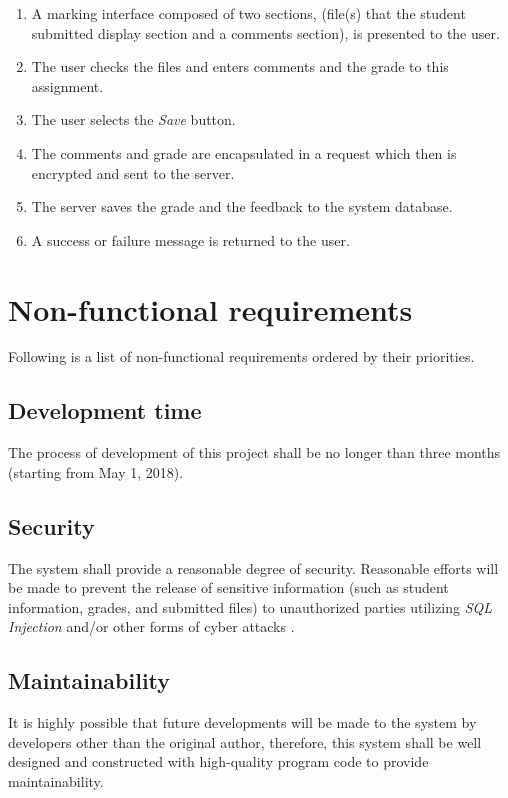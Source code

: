\begin{enumerate}
\begin{itemize}
\begin{enumerate}
            \item A marking interface composed of two sections, 
                (file(s) that the student submitted display section and
                a comments section), is presented to the user.
            \item The user checks the files and enters comments and the
                grade to this assignment.
            \item The user selects the \emph{Save} button.
            \item The comments and grade are encapsulated in a request which
                then is encrypted and sent to the server.
            \item The server saves the grade and the feedback to the system
                database.
            \item A success or failure message is returned to the user.
        \end{enumerate}
\end{itemize}
\end{enumerate}

\pagebreak

\section{Non-functional requirements}
Following is a list of non-functional requirements ordered by their priorities.

\subsection{Development time}
\label{TIMEFRAME}
The process of development of this project shall be no longer than three
months (starting from May 1, 2018).

\subsection{Security}
\label{SECURITY}
The system shall provide a reasonable degree of security.
Reasonable efforts will be made to prevent the release of 
sensitive information (such as student information, grades, and
submitted files) to unauthorized parties utilizing \emph{SQL Injection} 
and/or other forms of cyber attacks \cite{cyberAttacks}.

\subsection{Maintainability}
\label{MAINTAINABILITY}
It is highly possible that future developments will be made to the system by
developers other than the original author, therefore, this system shall be
well designed and constructed with high-quality program code to provide
maintainability.


